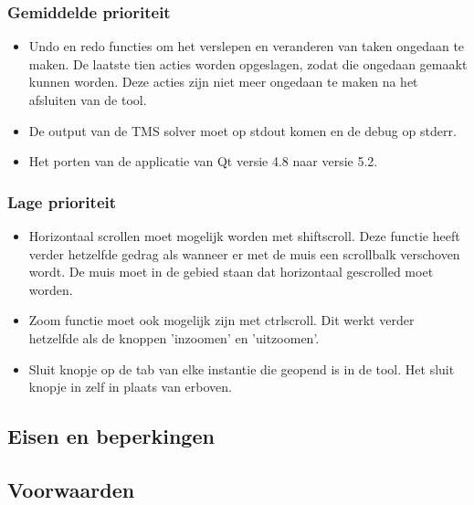 \subsubsection*{Gemiddelde prioriteit}
\begin{itemize}
	\item Undo en redo functies om het verslepen en veranderen van taken ongedaan te maken. De laatste tien acties worden opgeslagen, zodat die ongedaan gemaakt kunnen worden. Deze acties zijn niet meer ongedaan te maken na het afsluiten van de tool. 
	\item De output van de TMS solver moet op stdout komen en de debug op stderr.
	\item Het porten van de applicatie van Qt versie 4.8 naar versie 5.2.
\end{itemize}

\subsubsection*{Lage prioriteit}
\begin{itemize}
	\item Horizontaal scrollen moet mogelijk worden met shift\plus scroll. Deze functie heeft verder hetzelfde gedrag als wanneer er met de muis een scrollbalk verschoven wordt. De muis moet in de gebied staan dat horizontaal gescrolled moet worden. 
	\item Zoom functie moet ook mogelijk zijn met ctrl\plus scroll. Dit werkt verder hetzelfde als de knoppen 'inzoomen' en 'uitzoomen'.
	\item Sluit knopje op de tab van elke instantie die geopend is in de tool. Het sluit knopje in  zelf in plaats van erboven.
\end{itemize}



\subsection{Eisen en beperkingen}


\subsection{Voorwaarden}
